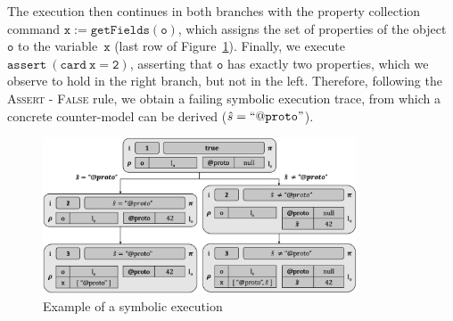 The execution then continues in both branches with the property collection command $\mathtt{x := getFields(o)}$, which assigns the set of properties of the object $\mathtt{o}$ to the variable~$\mathtt{x}$ (last row of Figure~\ref{fig:sexecexample}). Finally, we execute $\mathtt{assert\ (card \ x = 2)}$, asserting that $\mathtt{o}$ has exactly two properties, which we observe to hold in the right branch, but not in the left.
Therefore, following the \textsc{Assert - False} rule, we obtain a failing symbolic execution trace, from which a concrete counter-model can be derived ($\hat{s} = \mathtt{``@proto"}$).

\begin{figure}[!t]
\centering
\includegraphics[width=0.83\textwidth]{symbSemEx.png}
\vspace*{-0.1cm}
\caption{Example of a \jilette symbolic execution}
\label{fig:sexecexample}
\vspace*{-0.3cm}
\end{figure}














